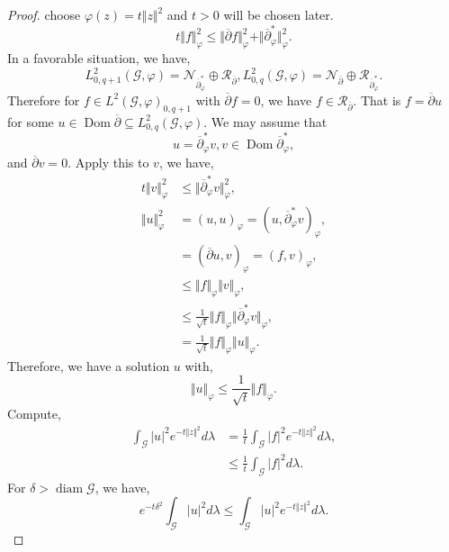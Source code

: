 \documentclass{article}
\DeclareMathOperator{\diam}{diam}
\DeclareMathOperator{\Dom}{Dom}
\newcommand{\norm}[1]{\Vert #1 \Vert}
\newcommand{\G}[0]{\mathcal{G}}
\newcommand{\cbd}[0]{\overline{\partial}}
\begin{document}
    \begin{proof}
      choose $\varphi(z) = t\norm{z}^2$ and $t>0$ will be chosen later.
      \begin{equation*}
        t\norm{f}^2_\varphi\leq\norm{\cbd f}_\varphi^2+\norm{\cbd^*_\varphi}_{\varphi}^2. 
      \end{equation*}
      In a favorable situation, we have,
      \begin{equation*}
        L_{0,q+1}^2(\G,\varphi) = \mathcal{N}_{\cbd_\varphi^*}\oplus\mathcal{R}_{\cbd},L^2_{0,q}(\G,\varphi) = \mathcal{N}_{\cbd}\oplus\mathcal{R}_{\cbd^*_\varphi}. 
      \end{equation*}
      Therefore for $f\in L^2(\G,\varphi)_{0,q+1}$ with $\cbd f=0$, we have $f\in\mathcal{R}_{\cbd}$. That is $f=\cbd u$ for some $u\in\Dom\cbd\subseteq L_{0,q}^2(\G,\varphi)$.
      We may assume that 
      \begin{equation*}
        u=\cbd_\varphi^*v,v\in\Dom\cbd^*_\varphi,
      \end{equation*}
      and $\cbd v=0$. Apply this to $v$, we have,
      \begin{align*}
        t\norm{v}^2_\varphi&\leq\norm{\cbd_\varphi^* v}_\varphi^2,\\
        \norm{u}_{\varphi}^2&=(u,u)_\varphi = (u,\cbd_\varphi^* v)_\varphi,\\
        & = (\cbd u,v)_\varphi=(f,v)_\varphi,\\
        & \leq \norm{f}_\varphi\norm{v}_{\varphi},\\
        &\leq {\frac 1{\sqrt{t}}}\norm{f}_\varphi\norm{\cbd_\varphi^* v}_\varphi,\\
        & = {\frac 1{\sqrt{t}}}\norm{f}_\varphi\norm{u}_\varphi.
      \end{align*}
      Therefore, we have a solution $u$ with,
      \begin{equation*}
        \norm{u}_\varphi\leq{\frac 1 {\sqrt{t}}}\norm{f}_\varphi.
      \end{equation*}
      Compute,
      \begin{align*}
        \int_\G\vert u\vert^2e^{-t\norm{z}^2}d\lambda & = {\frac 1 t}\int_\G \vert f\vert^2e^{-t\norm{z}^2}d\lambda,\\
        & \leq {\frac 1 t}\int_\G \vert f\vert^2 d\lambda.
      \end{align*}
      For $\delta>\diam\G$, we have,
      \begin{equation*}
        e^{-t\delta^2}\int_\G\vert u\vert^2d\lambda \leq \int_\G\vert u\vert^2e^{-t\norm{z}^2}d\lambda.

\end{equation*}
\end{proof}
\end{document}
